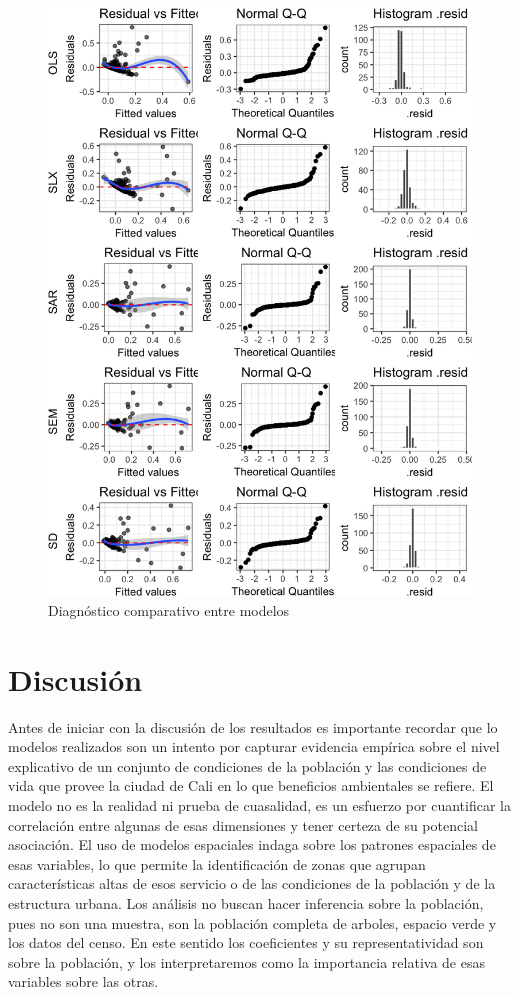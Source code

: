 \documentclass[12pt,]{book}
\begin{document}
\begin{figure}
\includegraphics[width=1\linewidth]{tesis-unigis_files/figure-latex/diag-model-areasdist-espaciales-1} \caption{Diagnóstico comparativo entre modelos}\label{fig:diag-model-areasdist-espaciales}
\end{figure}

\chapter{Discusión}\label{discusion}

Antes de iniciar con la discusión de los resultados es importante
recordar que lo modelos realizados son un intento por capturar evidencia
empírica sobre el nivel explicativo de un conjunto de condiciones de la
población y las condiciones de vida que provee la ciudad de Cali en lo
que beneficios ambientales se refiere. El modelo no es la realidad ni
prueba de cuasalidad, es un esfuerzo por cuantificar la correlación
entre algunas de esas dimensiones y tener certeza de su potencial
asociación. El uso de modelos espaciales indaga sobre los patrones
espaciales de esas variables, lo que permite la identificación de zonas
que agrupan características altas de esos servicio o de las condiciones
de la población y de la estructura urbana. Los análisis no buscan hacer
inferencia sobre la población, pues no son una muestra, son la población
completa de arboles, espacio verde y los datos del censo. En este
sentido los coeficientes y su representatividad son sobre la población,
y los interpretaremos como la importancia relativa de esas variables
sobre las otras.
\end{document}
